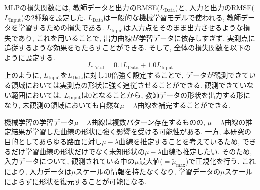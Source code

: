\documentclass[11pt,a4paper,oneside,onecolumn,fleqn,dvipdfmx]{jsarticle}
\begin{document}
MLPの損失関数には, 教師データと出力のRMSE($L_\mathrm{Data}$)と, 入力と出力のRMSE($L_\mathrm{Input}$)の2種類を設定した. 
$L_\mathrm{Data}$は一般的な機械学習モデルで使われる, 教師データを学習するための損失である.
$L_\mathrm{Input}$は入力点をそのまま出力させるような損失であり, これを用いることで, 出力曲線が学習データに依存しすぎず, 実測点に追従するような効果をもたらすことができる.
そして, 全体の損失関数を以下のように設定する. 
\begin{equation}
\label{eq:4_2_loss}
L_\mathrm{Total} = 0.1 L_\mathrm{Data} + 1.0 L_\mathrm{Input}
\end{equation}
上のように, $L_\mathrm{Input}$を$L_\mathrm{Data}$に対し10倍強く設定することで, データが観測できている領域においては実測点の形状に強く追従させることができる. 観測できていない範囲においては, $L_\mathrm{Input}$は0となることから, 教師データの形状を出力する形になり, 未観測の領域においても自然な$\mu-\lambda$曲線を補完することができる.

機械学習の学習データ$\mu-\lambda$曲線は複数パターン存在するものの, $\mu-\lambda$曲線の推定結果が学習した曲線の形状に強く影響を受ける可能性がある.
一方, 本研究の目的としてあらゆる路面に対し$\mu-\lambda$曲線を推定することを考えているため, できるだけ学習曲線の形状だけでなく未知形状の$\mu-\lambda$曲線も推定したい. 
そのため, 入力データについて, 観測されている中の$\mu$最大値($=\tilde{\mu}_\mathrm{max}$)で正規化を行う. 
これにより, 入力データは$\mu$スケールの情報を持たなくなり, 学習データの$\mu$スケールによらずに形状を復元することが可能になる. 

\clearpage
\end{document}
